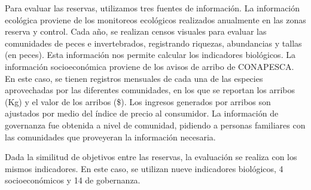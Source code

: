 \documentclass[12pt,]{article}
\begin{document}
Para evaluar las reservas, utilizamos tres fuentes de información. La
información ecológica proviene de los monitoreos ecológicos realizados
anualmente en las zonas reserva y control. Cada año, se realizan censos
visuales para evaluar las comunidades de peces e invertebrados,
registrando riquezas, abundancias y tallas (en peces). Esta información
nos permite calcular los indicadores biológicos. La información
socioeconómica proviene de los avisos de arribo de CONAPESCA. En este
caso, se tienen registros mensuales de cada una de las especies
aprovechadas por las diferentes comunidades, en los que se reportan los
arribos (Kg) y el valor de los arribos (\$). Los ingresos generados por
arribos son ajustados por medio del índice de precio al consumidor. La
información de governanza fue obtenida a nivel de comunidad, pidiendo a
personas familiares con las comunidades que proveyeran la información
necesaria.

Dada la similitud de objetivos entre las reservas, la evaluación se
realiza con los mismos indicadores. En este caso, se utilizan nueve
indicadores biológicos, 4 socioeconómicos y 14 de gobernanza.
\end{document}
